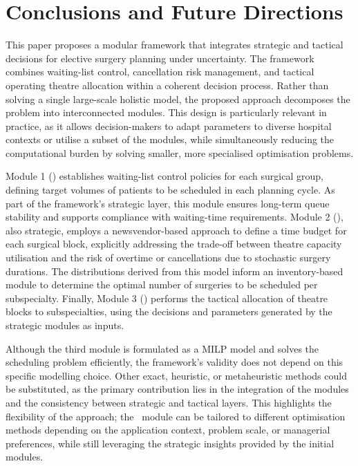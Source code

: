 \section{Conclusions and Future Directions\label{sec:conclusion}}

This paper proposes a modular framework that integrates strategic and tactical decisions for elective surgery planning under uncertainty. 
The framework combines waiting-list control, cancellation risk management, and tactical operating theatre allocation within a coherent decision process. 
Rather than solving a single large-scale holistic model, the proposed approach decomposes the problem into interconnected modules. 
This design is particularly relevant in practice, as it allows decision-makers to adapt parameters to diverse hospital contexts or utilise a subset of the modules, while simultaneously reducing the computational burden by solving smaller, more specialised optimisation problems.

Module 1 (\rqmodule) establishes waiting-list control policies for each surgical group, defining target volumes of patients to be scheduled in each planning cycle. 
As part of the framework's strategic layer, this module ensures long-term queue stability and supports compliance with waiting-time requirements. 
Module 2 (\overtimemodule), also strategic, employs a newsvendor-based approach to define a time budget for each surgical block, explicitly addressing the trade-off between theatre capacity utilisation and the risk of overtime or cancellations due to stochastic surgery durations. 
The distributions derived from this model inform an inventory-based module to determine the optimal number of surgeries to be scheduled per subspecialty. 
Finally, Module 3 (\otschedmodule) performs the tactical allocation of theatre blocks to subspecialties, using the decisions and parameters generated by the strategic modules as inputs.

Although the third module is formulated as a MILP model and solves the scheduling problem efficiently, the framework's validity does not depend on this specific modelling choice. 
Other exact, heuristic, or metaheuristic methods could be substituted, as the primary contribution lies in the integration of the modules and the consistency between strategic and tactical layers.
This highlights the flexibility of the approach; the \otschedmodule~module can be tailored to different optimisation methods depending on the application context, problem scale, or managerial preferences, while still leveraging the strategic insights provided by the initial modules.

